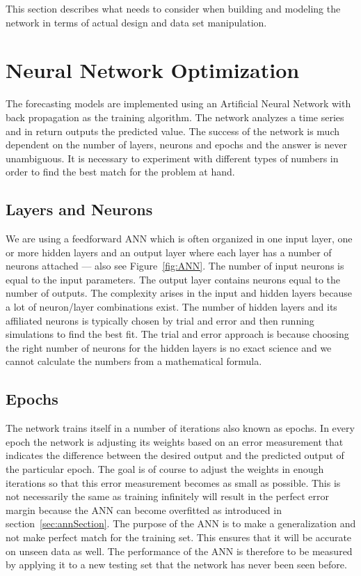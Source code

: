 This section describes what needs to consider when building and modeling the network in terms of actual design and data set manipulation.

\section{Neural Network Optimization}
\label{sec:neuralNetworkOptimization}
The forecasting models are implemented using an Artificial Neural Network with back propagation as the training algorithm. The network analyzes a time series and in return outputs the predicted value. The success of the network is much dependent on the number of layers, neurons and epochs and the answer is never unambiguous. It is necessary to experiment with different types of numbers in order to find the best match for the problem at hand.

\subsection{Layers and Neurons}
\label{sec:layersAndNeurons}
We are using a feedforward ANN which is often organized in one input layer, one or more hidden layers and an output layer where each layer has a number of neurons attached\cite{1} --- also see Figure~\ref{fig:ANN}. The number of input neurons is equal to the input parameters. The output layer contains neurons equal to the number of outputs. 
The complexity arises in the input and hidden layers because a lot of neuron/layer combinations exist. The number of hidden layers and its affiliated neurons is typically chosen by trial and error and then running simulations to find the best fit\cite{1}. The trial and error approach is because choosing the right number of neurons for the hidden layers is no exact science and we cannot calculate the numbers from a mathematical formula.

\subsection{Epochs}
\label{sec:epochs}
The network trains itself in a number of iterations also known as epochs. In every epoch the network is adjusting its weights based on an error measurement that indicates the difference between the desired output and the predicted output of the particular epoch\cite{1}. The goal is of course to adjust the weights in enough iterations so that this error measurement becomes as small as possible. This is not necessarily the same as training infinitely will result in the perfect error margin because the ANN can become overfitted as introduced in section~\ref{sec:annSection}. The purpose of the ANN is to make a generalization and not make perfect match for the training set. This ensures that it will be accurate on unseen data\cite{1} as well. The performance of the ANN is therefore to be measured by applying it to a new testing set that the network has never been seen before.

